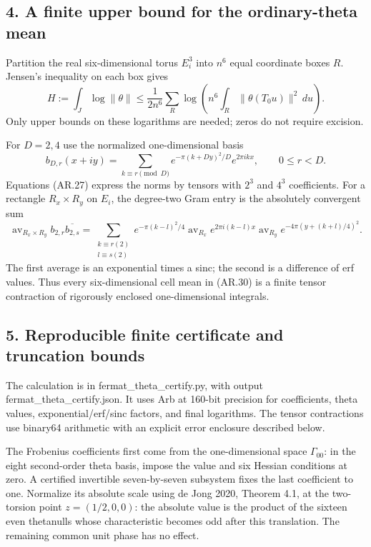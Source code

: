 \documentclass[11pt,a4paper]{article}
\begin{document}
\subsection{4. A finite upper bound for the ordinary-theta
mean}\label{a-finite-upper-bound-for-the-ordinary-theta-mean}

Partition the real six-dimensional torus \(E_i^3\) into \(n^6\) equal
coordinate boxes \(R\). Jensen's inequality on each box gives \[
H:=\int_J\log\|\theta\|
\le\frac1{2n^6}\sum_R
        \log\left(n^6\int_R\|\theta(T_0u)\|^2\,du\right).
\tag{AR.30}
\] Only upper bounds on these logarithms are needed; zeros do not
require excision.

For \(D=2,4\) use the normalized one-dimensional basis \[
b_{D,r}(x+iy)=
\sum_{k\equiv r\pmod D}
 e^{-\pi(k+Dy)^2/D}e^{2\pi ikx},
\qquad 0\le r<D.
\] Equations (AR.27) express the norms by tensors with \(2^3\) and
\(4^3\) coefficients. For a rectangle \(R_x\times R_y\) on \(E_i\), the
degree-two Gram entry is the absolutely convergent sum \[
\operatorname{av}_{R_x\times R_y}
 b_{2,r}\overline{b_{2,s}}
=\sum_{\substack{k\equiv r(2)\\l\equiv s(2)}}
 e^{-\pi(k-l)^2/4}
 \operatorname{av}_{R_x}e^{2\pi i(k-l)x}
 \operatorname{av}_{R_y}e^{-4\pi(y+(k+l)/4)^2}.
\tag{AR.31}
\] The first average is an exponential times a sinc; the second is a
difference of erf values. Thus every six-dimensional cell mean in
(AR.30) is a finite tensor contraction of rigorously enclosed
one-dimensional integrals.

\subsection{5. Reproducible finite certificate and truncation
bounds}\label{reproducible-finite-certificate-and-truncation-bounds}

The calculation is in fermat\_theta\_certify.py, with output
fermat\_theta\_certify.json. It uses Arb at 160-bit precision for
coefficients, theta values, exponential/erf/sinc factors, and final
logarithms. The tensor contractions use binary64 arithmetic with an
explicit error enclosure described below.

The Frobenius coefficients first come from the one-dimensional space
\(\Gamma_{00}\): in the eight second-order theta basis, impose the value
and six Hessian conditions at zero. A certified invertible
seven-by-seven subsystem fixes the last coefficient to one. Normalize
its absolute scale using de Jong 2020, Theorem 4.1, at the two-torsion
point \(z=(1/2,0,0)\): the absolute value is the product of the sixteen
even thetanulls whose characteristic becomes odd after this translation.
The remaining common unit phase has no effect.
\end{document}
